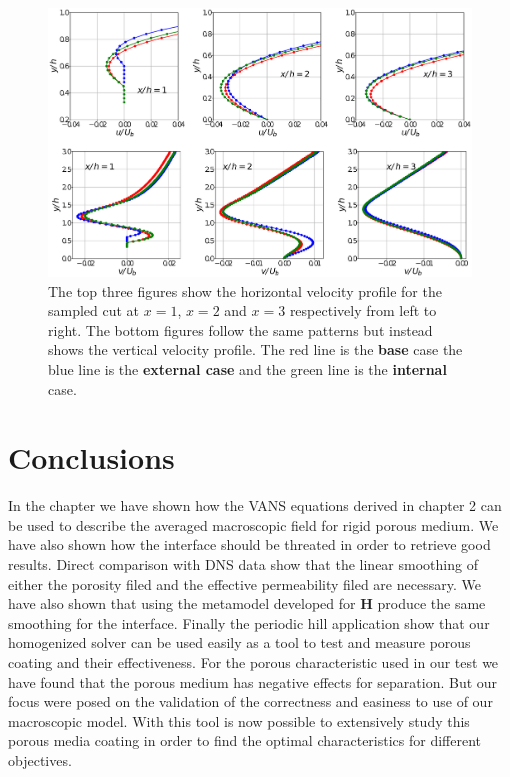 \begin{figure}[H]
	\centering
	\includegraphics[width=1\linewidth]{chapter_5/figure/cuts_hill}
	\caption{The top three figures show the horizontal velocity profile for the sampled cut at $x=1$, $x=2$ and $x=3$ respectively from left to right. The bottom figures follow the same patterns but instead shows the vertical velocity profile. The red line is the \textbf{base} case the blue line is the \textbf{external case} and the green line is the \textbf{internal} case.}
	\label{fig:cuts_hill}
\end{figure}


\section{Conclusions}

In the chapter we have shown how the VANS equations derived in chapter 2 can be used to describe the averaged macroscopic field for rigid porous medium. We have also shown how the interface should be threated in order to retrieve good results. Direct comparison with DNS data show that the linear smoothing of either the porosity filed and the effective permeability filed are necessary. We have also shown that using the metamodel developed for $\mathbf{H}$ produce the same smoothing for the interface. Finally the periodic hill application show that our homogenized solver can be used easily as a tool to test and measure porous coating and their effectiveness.
For the porous characteristic used in our test we have found that the porous medium has negative effects for separation. But our focus were posed on the validation of the correctness and easiness to use of our macroscopic model. With this tool is now possible to extensively study this porous media coating in order to find the optimal characteristics for different objectives.
